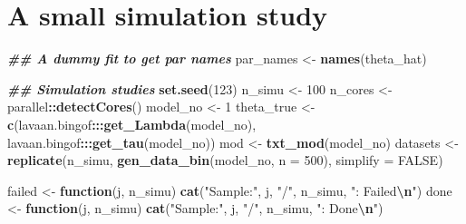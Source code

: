 \documentclass[
]{article}
\newenvironment{Shaded}{\begin{snugshade}}{\end{snugshade}}
\newcommand{\AttributeTok}[1]{\textcolor[rgb]{0.13,0.29,0.53}{#1}}
\newcommand{\ConstantTok}[1]{\textcolor[rgb]{0.56,0.35,0.01}{#1}}
\newcommand{\ControlFlowTok}[1]{\textcolor[rgb]{0.13,0.29,0.53}{\textbf{#1}}}
\newcommand{\DecValTok}[1]{\textcolor[rgb]{0.00,0.00,0.81}{#1}}
\newcommand{\DocumentationTok}[1]{\textcolor[rgb]{0.56,0.35,0.01}{\textbf{\textit{#1}}}}
\newcommand{\FunctionTok}[1]{\textcolor[rgb]{0.13,0.29,0.53}{\textbf{#1}}}
\newcommand{\NormalTok}[1]{#1}
\newcommand{\OtherTok}[1]{\textcolor[rgb]{0.56,0.35,0.01}{#1}}
\newcommand{\SpecialCharTok}[1]{\textcolor[rgb]{0.81,0.36,0.00}{\textbf{#1}}}
\newcommand{\StringTok}[1]{\textcolor[rgb]{0.31,0.60,0.02}{#1}}
\begin{document}
\section{A small simulation study}\label{a-small-simulation-study}

\begin{Shaded}
\begin{Highlighting}[]
\DocumentationTok{\#\# A dummy fit to get par names}
\NormalTok{par\_names }\OtherTok{\textless{}{-}} \FunctionTok{names}\NormalTok{(theta\_hat)}

\DocumentationTok{\#\# Simulation studies}
\FunctionTok{set.seed}\NormalTok{(}\DecValTok{123}\NormalTok{)}
\NormalTok{n\_simu }\OtherTok{\textless{}{-}} \DecValTok{100}
\NormalTok{n\_cores }\OtherTok{\textless{}{-}}\NormalTok{ parallel}\SpecialCharTok{::}\FunctionTok{detectCores}\NormalTok{()}
\NormalTok{model\_no }\OtherTok{\textless{}{-}} \DecValTok{1}
\NormalTok{theta\_true }\OtherTok{\textless{}{-}} \FunctionTok{c}\NormalTok{(lavaan.bingof}\SpecialCharTok{:::}\FunctionTok{get\_Lambda}\NormalTok{(model\_no),}
\NormalTok{                lavaan.bingof}\SpecialCharTok{:::}\FunctionTok{get\_tau}\NormalTok{(model\_no))}
\NormalTok{mod }\OtherTok{\textless{}{-}} \FunctionTok{txt\_mod}\NormalTok{(model\_no)}
\NormalTok{datasets }\OtherTok{\textless{}{-}} \FunctionTok{replicate}\NormalTok{(n\_simu, }\FunctionTok{gen\_data\_bin}\NormalTok{(model\_no, }\AttributeTok{n =} \DecValTok{500}\NormalTok{), }\AttributeTok{simplify =} \ConstantTok{FALSE}\NormalTok{)}

\NormalTok{failed }\OtherTok{\textless{}{-}} \ControlFlowTok{function}\NormalTok{(j, n\_simu) }\FunctionTok{cat}\NormalTok{(}\StringTok{"Sample:"}\NormalTok{, j, }\StringTok{"/"}\NormalTok{, n\_simu, }\StringTok{": Failed}\SpecialCharTok{\textbackslash{}n}\StringTok{"}\NormalTok{)}
\NormalTok{done }\OtherTok{\textless{}{-}} \ControlFlowTok{function}\NormalTok{(j, n\_simu) }\FunctionTok{cat}\NormalTok{(}\StringTok{"Sample:"}\NormalTok{, j, }\StringTok{"/"}\NormalTok{, n\_simu, }\StringTok{": Done}\SpecialCharTok{\textbackslash{}n}\StringTok{"}\NormalTok{)}


\end{Highlighting}
\end{Shaded}
\end{document}
